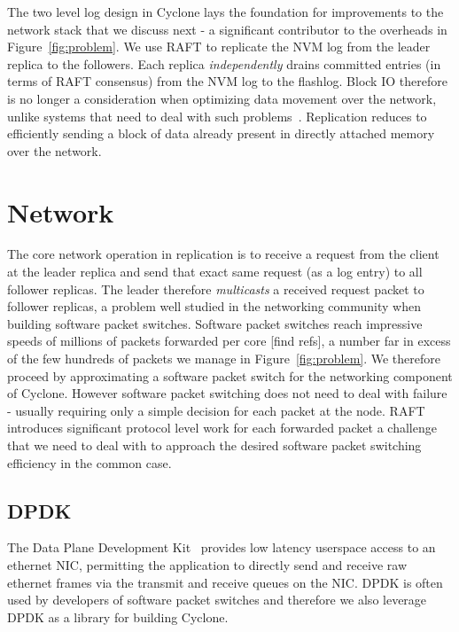 \documentclass[pageno]{jpaper}
\begin{document}
The two level log design in Cyclone lays the foundation for improvements to the
network stack that we discuss next - a significant contributor to the overheads
in Figure~\ref{fig:problem}. We use RAFT to replicate the NVM log from the
leader replica to the followers. Each replica \emph{independently} drains
committed entries (in terms of RAFT consensus) from the NVM log to the
flashlog. Block IO therefore is no longer a consideration when optimizing data
movement over the network, unlike systems that need to deal with such
problems~\cite{reflex}. Replication reduces to efficiently sending a block of
data already present in directly attached memory over the network. 

\section{Network}
\label{sec:network}

The core network operation in replication is to receive a request from the
client at the leader replica and send that exact same request (as a log entry)
to all follower replicas. The leader therefore \emph{multicasts} a received
request packet to follower replicas, a problem well studied in the networking
community when building software packet switches. Software packet switches reach
impressive speeds of millions of packets forwarded per core [find refs], a
number far in excess of the few hundreds of packets we manage in
Figure~\ref{fig:problem}. We therefore proceed by approximating a software
packet switch for the networking component of Cyclone. However software packet
switching does not need to deal with failure - usually requiring only a simple
decision for each packet at the node. RAFT introduces significant
protocol level work for each forwarded packet a challenge that we need to deal
with to approach the desired software packet switching efficiency in the common
case.

\subsection{DPDK}
The Data Plane Development Kit~\cite{dpdk} provides low latency userspace access
to an ethernet NIC, permitting the application to directly send and receive raw
ethernet frames via the transmit and receive queues on the NIC. DPDK is often
used by developers of software packet switches and therefore we also leverage
DPDK as a library for building Cyclone.
\end{document}
